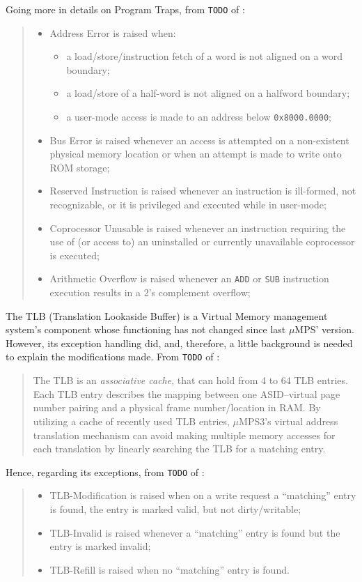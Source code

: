\documentclass[12pt,a4paper,openright,twoside]{report}
\begin{document}
Going more in details on Program Traps, from \texttt{TODO} of \cite{pops}:
\begin{quote}
	\begin{itemize}
		\item Address Error is raised when:
		      \begin{itemize}
			      \item a load/store/instruction fetch of a word is not aligned on a word boundary;
			      \item a load/store of a half-word is not aligned on a halfword boundary;
			      \item a user-mode access is made to an address below \texttt{0x8000.0000};
		      \end{itemize}
		\item Bus Error is raised whenever an access is attempted on a non-existent physical memory location or when an attempt is made to write onto ROM storage;
		\item Reserved Instruction is raised whenever an instruction is ill-formed, not recognizable, or it is privileged and executed while in user-mode;
		\item Coprocessor Unusable is raised whenever an instruction requiring the use of (or access to) an uninstalled or currently unavailable coprocessor is executed;
		\item Arithmetic Overflow is raised whenever an \texttt{ADD} or \texttt{SUB} instruction execution results in a 2's complement overflow;
	\end{itemize}
\end{quote}

The TLB (Translation Lookaside Buffer) is a Virtual Memory management system's component whose functioning has not changed since last $\mu$MPS' version.
However, its exception handling did, and, therefore, a little background is needed to explain the modifications made. From \texttt{TODO} of \cite{pops}:
\begin{quote}
	The TLB is an \textit{associative cache}, that can hold from 4 to 64 TLB entries.
	Each TLB entry describes the mapping between one ASID–virtual page number pairing and a physical frame number/location in RAM.
	By utilizing a cache of recently used TLB entries, $\mu$MPS3's virtual address translation mechanism can avoid making multiple memory accesses for each translation by linearly searching the TLB for a matching entry.
\end{quote}

Hence, regarding its exceptions, from \texttt{TODO} of \cite{pops}:
\begin{quote}
	\begin{itemize}
		\item TLB-Modification is raised when on a write request a ``matching'' entry is found, the entry is marked valid, but not dirty/writable;
		\item TLB-Invalid is raised whenever a ``matching'' entry is found but the entry is marked invalid;
		\item TLB-Refill is raised when no ``matching'' entry is found.
	\end{itemize}
\end{quote}
\end{document}
